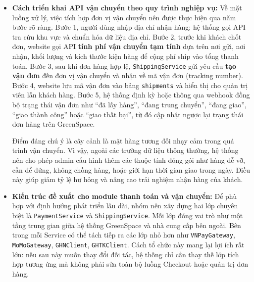 \documentclass[11pt, a4paper]{article}
\begin{document}
\begin{itemize}[leftmargin=*]
    Để làm được điều này, cơ sở dữ liệu nên bổ sung thêm bảng
    \texttt{shipments} gồm các trường như \texttt{order\_id},
    \texttt{carrier}, \texttt{service\_code}, \texttt{tracking\_number},
    \texttt{shipping\_fee}, \texttt{expected\_delivery\_date},
    \texttt{shipment\_status}, \texttt{raw\_response} và thời điểm đồng bộ
    gần nhất. Bảng này giúp tách bạch dữ liệu thương mại điện tử với dữ liệu
    logistics, đồng thời hỗ trợ debug khi phía đối tác trả về lỗi. Nhóm cũng
    có thể bổ sung một bảng \texttt{shipping\_addresses} hoặc mở rộng địa chỉ
    hiện có để lưu đầy đủ mã tỉnh/thành, quận/huyện, phường/xã theo cấu trúc
    chuẩn mà API của đơn vị vận chuyển yêu cầu.

    \item \textbf{Cách triển khai API vận chuyển theo quy trình nghiệp vụ:}
    Về mặt luồng xử lý, việc tích hợp đơn vị vận chuyển nên được thực hiện qua
    năm bước rõ ràng. Bước 1, người dùng nhập địa chỉ nhận hàng; hệ thống gọi
    API tra cứu khu vực và chuẩn hóa dữ liệu địa chỉ. Bước 2, trước khi khách
    chốt đơn, website gọi API \textbf{tính phí vận chuyển tạm tính} dựa trên
    nơi gửi, nơi nhận, khối lượng và kích thước kiện hàng để cộng phí ship vào
    tổng thanh toán. Bước 3, sau khi đơn hàng hợp lệ, \texttt{ShippingService}
    gửi yêu cầu \textbf{tạo vận đơn} đến đơn vị vận chuyển và nhận về mã vận
    đơn (tracking number). Bước 4, website lưu mã vận đơn vào bảng
    \texttt{shipments} và hiển thị cho quản trị viên lẫn khách hàng. Bước 5,
    hệ thống định kỳ hoặc thông qua webhook đồng bộ trạng thái vận đơn như
    ``đã lấy hàng'', ``đang trung chuyển'', ``đang giao'', ``giao thành công''
    hoặc ``giao thất bại'', từ đó cập nhật ngược lại trạng thái đơn hàng trên
    GreenSpace.

    Điểm đáng chú ý là cây cảnh là mặt hàng tương đối nhạy cảm trong quá trình
    vận chuyển. Vì vậy, ngoài các trường dữ liệu thông thường, hệ thống nên cho
    phép admin cấu hình thêm các thuộc tính đóng gói như hàng dễ vỡ, cần để
    đứng, không chồng hàng, hoặc giới hạn thời gian giao trong ngày. Điều này
    giúp giảm tỷ lệ hư hỏng và nâng cao trải nghiệm nhận hàng của khách.

    \item \textbf{Kiến trúc đề xuất cho module thanh toán và vận chuyển:}
    Để phù hợp với định hướng phát triển lâu dài, nhóm nên xây dựng hai lớp
    chuyên biệt là \texttt{PaymentService} và \texttt{ShippingService}. Mỗi
    lớp đóng vai trò như một tầng trung gian giữa hệ thống GreenSpace và nhà
    cung cấp bên ngoài. Bên trong mỗi Service có thể tách tiếp ra các lớp nhỏ
    hơn như \texttt{VNPayGateway}, \texttt{MoMoGateway}, \texttt{GHNClient},
    \texttt{GHTKClient}. Cách tổ chức này mang lại lợi ích rất lớn: nếu sau
    này muốn thay đổi đối tác, hệ thống chỉ cần thay thế lớp tích hợp tương
    ứng mà không phải sửa toàn bộ luồng Checkout hoặc quản trị đơn hàng.


\end{itemize}
\end{document}
